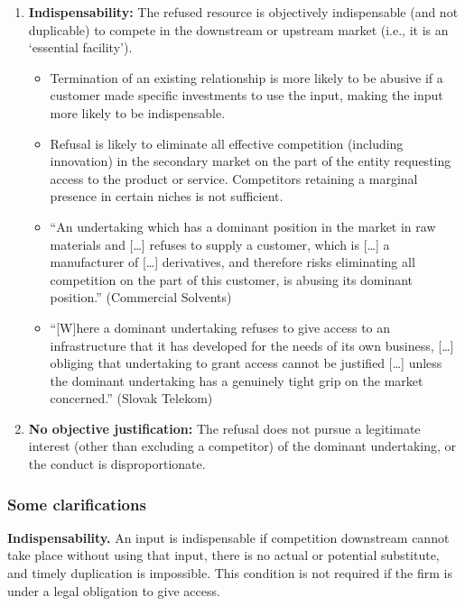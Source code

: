             \begin{enumerate}
                \item \textbf{Indispensability:} The refused resource is objectively indispensable (and not duplicable) to compete in the downstream or upstream market (i.e., it is an ‘essential facility’).
                \begin{itemize}
                    \item Termination of an existing relationship is more likely to be abusive if a customer made specific investments to use the input, making the input more likely to be indispensable.
                    \item Refusal is likely to eliminate all effective competition (including innovation) in the secondary market on the part of the entity requesting access to the product or service. Competitors retaining a marginal presence in certain niches is not sufficient.
                    \item “An undertaking which has a dominant position in the market in raw materials and […] refuses to supply a customer, which is […] a manufacturer of […] derivatives, and therefore risks eliminating all competition on the part of this customer, is abusing its dominant position.” (Commercial Solvents)
                    \item “[W]here a dominant undertaking refuses to give access to an infrastructure that it has developed for the needs of its own business, […] obliging that undertaking to grant access cannot be justified […] unless the dominant undertaking has a genuinely tight grip on the market concerned.” (Slovak Telekom)
                \end{itemize}
                \item \textbf{No objective justification:} The refusal does not pursue a legitimate interest (other than excluding a competitor) of the dominant undertaking, or the conduct is disproportionate.
            \end{enumerate}

        \subsubsection{Some clarifications}

            \textbf{Indispensability.} An input is indispensable if competition downstream cannot take place without using that input, there is no actual or potential substitute, and timely duplication is impossible. This condition is not required if the firm is under a legal obligation to give access.

